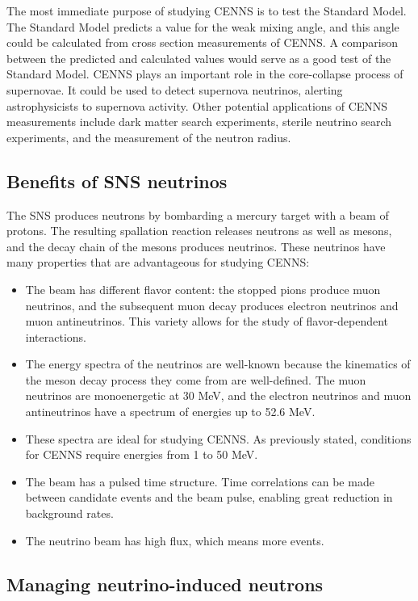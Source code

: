 \documentclass[12pt]{article}
\begin{document}
The most immediate purpose of studying CENNS is to test the Standard Model. The Standard Model predicts a value for the weak mixing angle, and this angle could be calculated from cross section measurements of CENNS. A comparison between the predicted and calculated values would serve as a good test of the Standard Model. CENNS plays an important role in the core-collapse process of supernovae. It could be used to detect supernova neutrinos, alerting astrophysicists to supernova activity. Other potential applications of CENNS measurements include dark matter search experiments, sterile neutrino search experiments, and the measurement of the neutron radius.

\subsection{Benefits of SNS neutrinos \cite{CSI}} 

The SNS produces neutrons by bombarding a mercury target with a beam of protons. The resulting spallation reaction releases neutrons as well as mesons, and the decay chain of the mesons produces neutrinos. These neutrinos have many properties that are advantageous for studying CENNS: 
\begin{itemize} 
  \item The beam has different flavor content: the stopped pions produce muon neutrinos, and the subsequent muon decay produces electron neutrinos and muon antineutrinos. This variety allows for the study of flavor-dependent interactions. 
  \item The energy spectra of the neutrinos are well-known because the kinematics of the meson decay process they come from are well-defined. The muon neutrinos are monoenergetic at 30 MeV, and the electron neutrinos and muon antineutrinos have a spectrum of energies up to 52.6 MeV. 
  \item These spectra are ideal for studying CENNS. As previously stated, conditions for CENNS require energies from 1 to 50 MeV. 
  \item The beam has a pulsed time structure. Time correlations can be made between candidate events and the beam pulse, enabling great reduction in background rates. 
  \item The neutrino beam has high flux, which means more events. 
\end{itemize}

\subsection{Managing neutrino-induced neutrons} 
\end{document}
